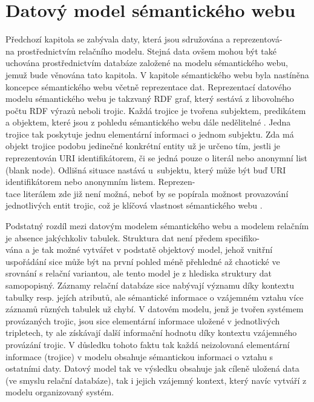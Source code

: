 \documentclass{projekt}
\begin{document}
\chapter{Datový model sémantického webu}
\hspace{0.65cm}Předchozí kapitola se zabývala daty, která jsou sdružována a reprezentová-\\na prostřednictvím relačního modelu. Stejná data ovšem mohou být také uchována prostřednictvím databáze založené na modelu sémantického webu, jemuž bude věnována tato kapitola. V kapitole sémantického webu byla nastíněna koncepce sémantického webu včetně reprezentace dat. Reprezentací datového modelu sémantického webu je takzvaný RDF graf, který sestává z libovolného počtu RDF výrazů neboli trojic. Každá trojice je tvořena subjektem, predikátem a objektem, které jsou z pohledu sémantického webu dále nedělitelné \cite{_8}. Jedna trojice tak poskytuje jednu elementární informaci o jednom subjektu. Zda má objekt trojice podobu jedinečné konkrétní entity už je určeno tím, jestli je reprezentován URI identifikátorem, či se jedná pouze o literál nebo anonymní list (blank node). Odlišná situace nastává u~subjektu, který může být buď URI identifikátorem nebo anonymním listem. Reprezen-\\tace literálem zde již není možná, neboť by se popírala možnost provazování jednotlivých entit trojic, což je klíčová vlastnost sémantického webu \cite{_9}.

Podstatný rozdíl mezi datovým modelem sémantického webu a modelem relačním je absence jakýchkoliv tabulek. Struktura dat není předem specifiko-\\vána a je tak možné vytvářet v podstatě objektový model, jehož vnitřní uspořádání sice může být na první pohled méně přehledné až chaotické ve srovnání s relační variantou, ale tento model je z hlediska struktury dat samopopisný. Záznamy relační databáze sice nabývají významu díky kontextu tabulky resp. jejích atributů, ale sémantické informace o vzájemném vztahu více záznamů různých tabulek už chybí. V datovém modelu, jenž je tvořen systémem provázaných trojic, jsou sice elementární informace uložené v jednotlivých tripletech, ty ale získávají další informační hodnotu díky kontextu vzájemného provázání trojic. V důsledku tohoto faktu tak každá neizolovaná elementární informace (trojice) v modelu obsahuje sémantickou informaci o vztahu s ostatními daty. Datový model tak ve výsledku obsahuje jak cíleně uložená data (ve smyslu relační databáze), tak i jejich vzájemný kontext, který navíc vytváří z modelu organizovaný systém.
\end{document}

